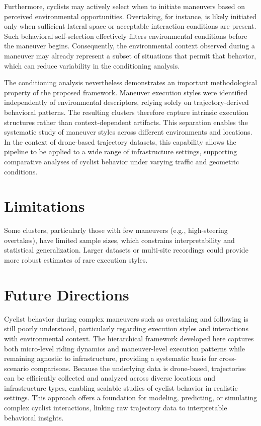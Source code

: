 Furthermore, cyclists may actively select when to initiate maneuvers based on perceived environmental opportunities. Overtaking, for instance, is likely initiated only when sufficient lateral space or acceptable interaction conditions are present. Such behavioral self-selection effectively filters environmental conditions before the maneuver begins. Consequently, the environmental context observed during a maneuver may already represent a subset of situations that permit that behavior, which can reduce variability in the conditioning analysis.

The conditioning analysis nevertheless demonstrates an important methodological property of the proposed framework. Maneuver execution styles were identified independently of environmental descriptors, relying solely on trajectory-derived behavioral patterns. The resulting clusters therefore capture intrinsic execution structures rather than context-dependent artifacts. This separation enables the systematic study of maneuver styles across different environments and locations. In the context of drone-based trajectory datasets, this capability allows the pipeline to be applied to a wide range of infrastructure settings, supporting comparative analyses of cyclist behavior under varying traffic and geometric conditions.


\section{Limitations}

Some clusters, particularly those with few maneuvers (e.g., high-steering overtakes), have limited sample sizes, which constrains interpretability and statistical generalization. Larger datasets or multi-site recordings could provide more robust estimates of rare execution styles.

\section{Future Directions}

Cyclist behavior during complex maneuvers such as overtaking and following is still poorly understood, particularly regarding execution styles and interactions with environmental context. The hierarchical framework developed here captures both micro-level riding dynamics and maneuver-level execution patterns while remaining agnostic to infrastructure, providing a systematic basis for cross-scenario comparisons. Because the underlying data is drone-based, trajectories can be efficiently collected and analyzed across diverse locations and infrastructure types, enabling scalable studies of cyclist behavior in realistic settings. This approach offers a foundation for modeling, predicting, or simulating complex cyclist interactions, linking raw trajectory data to interpretable behavioral insights.

